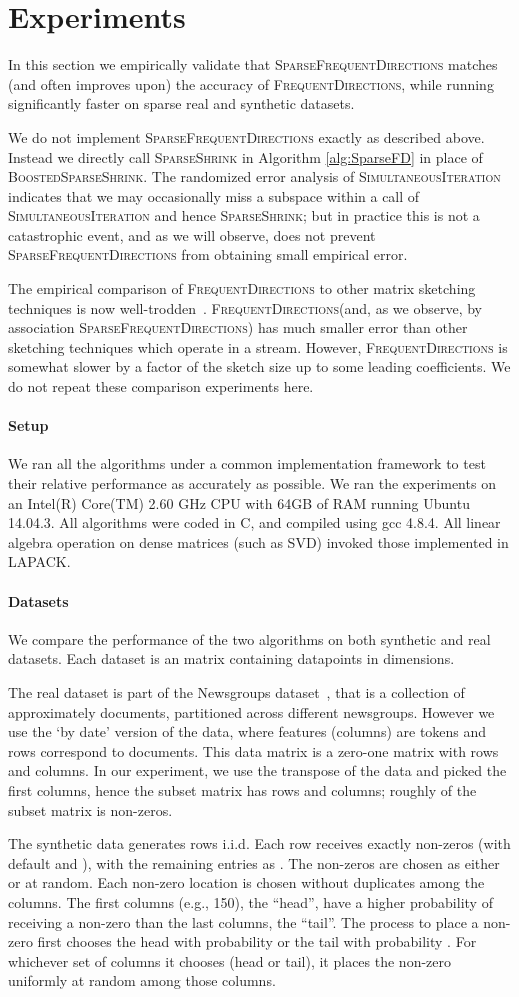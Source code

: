 \documentclass[11pt]{article}
\newcommand{\fd}{\textsc{FrequentDirections}\xspace}
\newcommand{\sfd}{\textsc{SparseFrequentDirections}\xspace}
\newcommand{\si}{\textsc{SimultaneousIteration}\xspace}
\newcommand{\SSh}{\textsc{SparseShrink}\xspace}
\newcommand{\BSSh}{\textsc{BoostedSparseShrink}\xspace}
\newcommand{\Paragraph}[1]{\paragraph*{\sffamily \textbf{#1}}}
\begin{document}
\section{Experiments}
\label{sec:exp}
In this section we empirically validate that \sfd matches (and often improves upon) the accuracy of \fd, while running significantly faster on sparse real and synthetic datasets.  

We do not implement \sfd exactly as described above.  Instead we directly call \SSh in Algorithm \ref{alg:SparseFD} in place of \BSSh.  The randomized error analysis of \si indicates that we may occasionally miss a subspace within a call of \si and hence \SSh; but in practice this is not a catastrophic event, and as we will observe, does not prevent \sfd from obtaining small empirical error.  

The empirical comparison of \fd to other matrix sketching techniques is now well-trodden~\cite{ghashami2015frequent,desai2015improved}.  \fd (and, as we observe, by association \sfd) has much smaller error than other sketching techniques which operate in a stream.  However, \fd is somewhat slower by a factor of the sketch size  up to some leading coefficients.  
We do not repeat these comparison experiments here.  

\Paragraph{Setup} 
We ran all the algorithms under a common implementation framework to test their relative performance as accurately as possible. We ran the experiments on an Intel(R) Core(TM) 2.60 GHz CPU with 64GB of RAM running Ubuntu 14.04.3. 
All algorithms were coded in C, and compiled using gcc 4.8.4.
All linear algebra operation on dense matrices (such as SVD) invoked those implemented in LAPACK. 

\Paragraph{Datasets} 
We compare the performance of the two algorithms on both synthetic and real datasets. Each dataset is an  matrix  containing  datapoints in  dimensions. 

The real dataset is part of the  Newsgroups dataset~\cite{Lang95}, that is a collection of approximately  documents, partitioned across  different newsgroups. However we use the `by date' version of the data, where features (columns) are tokens and rows correspond to documents. This data matrix is a zero-one matrix with  rows and  columns. In our experiment, we use the transpose of the data and picked the first  columns, hence the subset matrix has  rows and  columns; roughly  of the subset matrix is non-zeros.


The synthetic data generates  rows i.i.d.  
Each row receives exactly  non-zeros (with default  and ), with the remaining entries as .  
The non-zeros are chosen as either  or  at random.  
Each non-zero location is chosen without duplicates among the columns. 
The first  columns (e.g., 150), the ``head'', have a higher probability of receiving a non-zero than the last  columns, the ``tail''.   The process to place a non-zero first chooses the head with probability  or the tail with probability .  For whichever set of columns it chooses (head or tail), it places the non-zero uniformly at random among those columns.  
\end{document}
